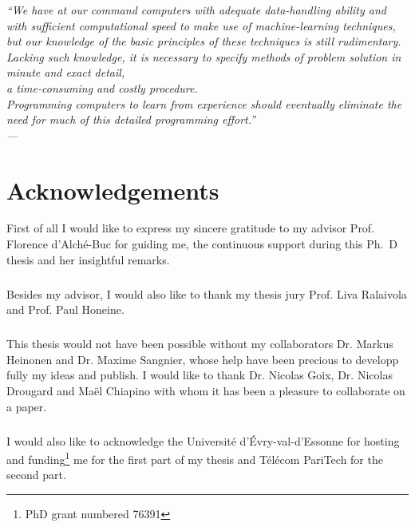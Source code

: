 

\begin{flushright}{\slshape
``We have at our command computers with adequate data-handling ability and with
sufficient computational speed to make use of machine-learning techniques, \\
but our knowledge of the basic principles of these techniques is still
rudimentary. \\
Lacking such knowledge, it is necessary to specify methods of
problem solution in minute and exact detail, \\
a time-consuming and costly procedure. \\
Programming computers to learn from experience should eventually
eliminate the need for much of this detailed programming effort.'' \\
--- 
\citep{samuel1959some}}
\end{flushright}

\bigskip


\begingroup

\let\clearpage\relax
\let\cleardoublepage\relax
\let\cleardoublepage\relax

\chapter*{Acknowledgements}

First of all I would like to express my sincere gratitude to my advisor Prof.
Florence d'Alch\'e-Buc for guiding me, the continuous support during this
Ph.~D thesis and her insightful remarks.
\paragraph{}
Besides my advisor, I would also like to thank my thesis jury Prof. Liva
Ralaivola and Prof. Paul Honeine.
\paragraph{}
This thesis would not have been possible without my collaborators Dr. Markus
Heinonen and Dr. Maxime Sangnier, whose help have been precious to developp
fully my ideas and publish. I would like to thank Dr. Nicolas Goix, Dr. Nicolas
Drougard and Ma\"el Chiapino with whom it has been a pleasure to collaborate on
a paper.
\paragraph{}
I would also like to acknowledge the Universit\'e d'\'Evry-val-d'Essonne for
hosting and funding\footnote{PhD grant numbered 76391} me for the first part
of my thesis and T\'el\'ecom PariTech for the second part.

\endgroup

\chapterend
